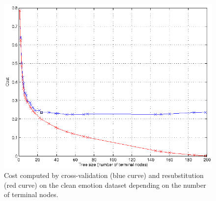 \documentclass[a4paper,12pt,oneside,final]{report}
\begin{document}
\begin{figure}[!h]
\center
\includegraphics{pruning_example_clean.png}
\caption[Pruning example on clean data.]{Cost computed by cross-validation (blue curve) and resubstitution (red curve) on the clean emotion dataset depending on the number of terminal nodes. \label{fig:pruning}}
\end{figure}
\FloatBarrier
\end{document}

